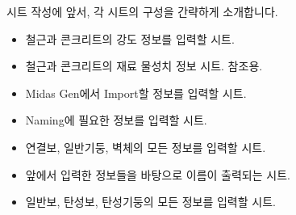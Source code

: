 \documentclass[a4paper,10pt,korean]{sphinxmanual}
\begin{document}
\sphinxAtStartPar
시트 작성에 앞서, 각 시트의 구성을 간략하게 소개합니다.
\begin{itemize}
\item {} \begin{description}
\sphinxAtStartPar
철근과 콘크리트의 강도 정보를 입력할 시트.

\end{description}

\item {} \begin{description}
\sphinxAtStartPar
철근과 콘크리트의 재료 물성치 정보 시트. 참조용.

\end{description}

\item {} \begin{description}
\sphinxAtStartPar
Midas Gen에서 Import할 정보를 입력할 시트.

\end{description}

\item {} \begin{description}
\sphinxAtStartPar
Naming에 필요한 정보를 입력할 시트.

\end{description}

\item {} \begin{description}
\sphinxAtStartPar
연결보, 일반기둥, 벽체의 모든 정보를 입력할 시트.

\end{description}

\item {} \begin{description}
\sphinxAtStartPar
앞에서 입력한 정보들을 바탕으로 이름이 출력되는 시트.

\end{description}

\item {} \begin{description}
\sphinxAtStartPar
일반보, 탄성보, 탄성기둥의 모든 정보를 입력할 시트.


\end{description}
\end{itemize}
\end{document}
